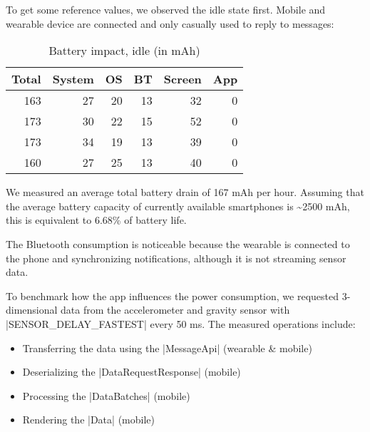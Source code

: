 To get some reference values, we observed the idle state first.
Mobile and wearable device are connected and only casually used to reply to messages:

\begin{table}[H]
    \centering
    \begin{tabular}{rrrrrr}
        Total    & System   & OS       & BT       & Screen   & App  \\ \hline

        163      & 27       & 20       & 13       & 32       & 0    \\
        173      & 30       & 22       & 15       & 52       & 0    \\
        173      & 34       & 19       & 13       & 39       & 0    \\
        160      & 27       & 25       & 13       & 40       & 0    \\
    \end{tabular}
    \caption{Battery impact, idle (in mAh)}
    \label{table:benchmark:battery:idle}
\end{table}

We measured an average total battery drain of 167 mAh per hour.
Assuming that the average battery capacity of currently available smartphones is \textasciitilde2500 mAh, this is equivalent to 6.68\% of battery life.

The Bluetooth consumption is noticeable because the wearable is connected to the phone and synchronizing notifications, although it is not streaming sensor data.

To benchmark how the app influences the power consumption, we requested 3-dimensional data from the accelerometer and gravity sensor with |SENSOR_DELAY_FASTEST| every 50 ms. The measured operations include:

\begin{itemize}[noitemsep]
    \item Transferring the data using the |MessageApi| (wearable \& mobile)
    \item Deserializing the |DataRequestResponse| (mobile)
    \item Processing the |DataBatches| (mobile)
    \item Rendering the |Data|\cite{sensordatalogger:data} (mobile)
\end{itemize}

